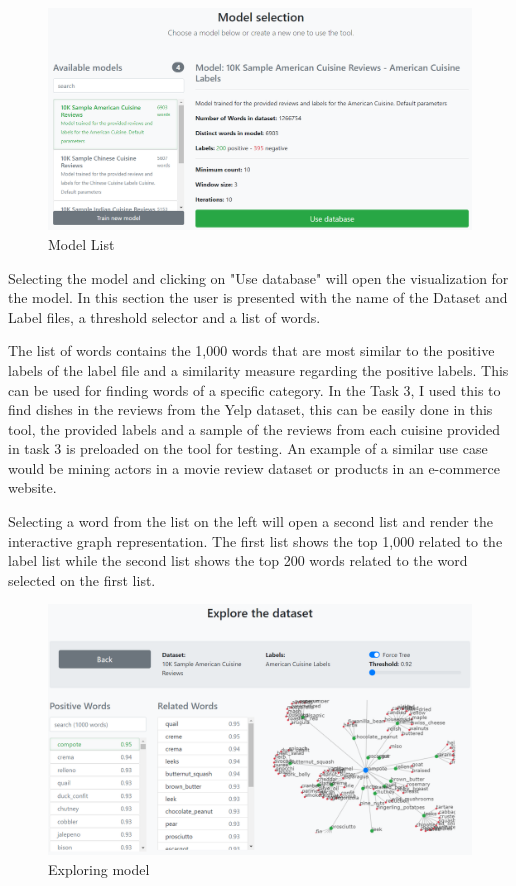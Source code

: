 \documentclass[table,xcdraw]{article}
\begin{document}
\begin{figure}[H]
	\centering
	\includegraphics[width=\linewidth]{screen_model_list}
	\caption{Model List}
	\label{fig:screen_model_list}
	\end{figure}

Selecting the model and clicking on "Use database" will open the visualization for the model.
In this section the user is presented with the name of the Dataset and Label files, a threshold selector and a list of words.

The list of words contains the 1,000 words that are most similar to the positive labels of the label file and a similarity measure regarding the positive labels. This can be used for finding words of a specific category. In the Task 3, I used this to find dishes in the reviews from the Yelp dataset, this can be easily done in this tool, the provided labels and a sample of the reviews from each cuisine provided in task 3 is preloaded on the tool for testing.
An example of a similar use case would be mining actors in a movie review dataset or products in an e-commerce website.

Selecting a word from the list on the left will open a second list and render the interactive graph representation.
The first list shows the top 1,000 related to the label list while the second list shows the top 200 words related to the word selected on the first list.

\begin{figure}[H]
	\centering
	\includegraphics[width=\linewidth]{screen_explore_model}
	\caption{Exploring model}
	\label{fig:screen_explore_model}
	\end{figure}
\end{document}
